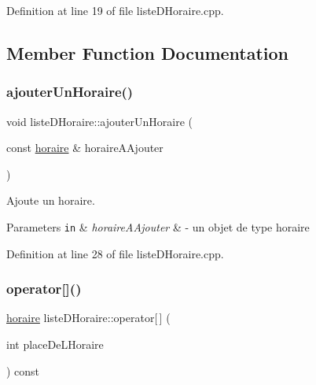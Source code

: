 Definition at line 19 of file liste\+D\+Horaire.\+cpp.



\subsection{Member Function Documentation}
\hypertarget{classliste_d_horaire_a30f35985eb14300ad9cf8f44ef9d651e}{}\label{classliste_d_horaire_a30f35985eb14300ad9cf8f44ef9d651e} 
\subsubsection{\texorpdfstring{ajouter\+Un\+Horaire()}{ajouterUnHoraire()}}
{\footnotesize\ttfamily void liste\+D\+Horaire\+::ajouter\+Un\+Horaire (\begin{DoxyParamCaption}\item[{const \hyperlink{classhoraire}{horaire} \&}]{horaire\+A\+Ajouter }\end{DoxyParamCaption})}



Ajoute un horaire. 


\begin{DoxyParams}[1]{Parameters}
\mbox{\tt in}  & {\em horaire\+A\+Ajouter} & -\/ un objet de type horaire \\
\hline
\end{DoxyParams}


Definition at line 28 of file liste\+D\+Horaire.\+cpp.

\hypertarget{classliste_d_horaire_a23b08c00c1d32405bd84045ca9b6208a}{}\label{classliste_d_horaire_a23b08c00c1d32405bd84045ca9b6208a} 
\subsubsection{\texorpdfstring{operator[]()}{operator[]()}}
{\footnotesize\ttfamily \hyperlink{classhoraire}{horaire} liste\+D\+Horaire\+::operator\mbox{[}$\,$\mbox{]} (\begin{DoxyParamCaption}\item[{int}]{place\+De\+L\+Horaire }\end{DoxyParamCaption}) const}




